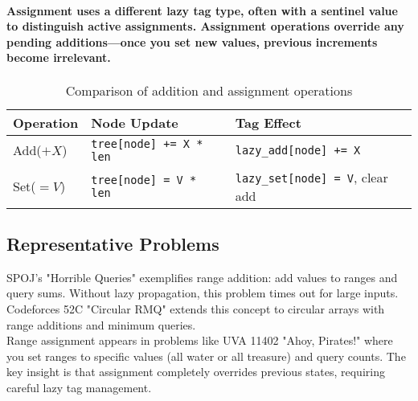 \paragraph{Assignment uses a different lazy tag type, often with a sentinel value to distinguish active assignments. Assignment operations override any pending additions—once you set new values, previous increments become irrelevant.}
\begin{table}
\footnotesize
\begin{tabular}{@{}lll@{}}
\toprule
\textbf{Operation} & \textbf{Node Update} & \textbf{Tag Effect} \\
\midrule
Add($+X$) & \texttt{tree[node] += X * len} & \texttt{lazy\_add[node] += X} \\
Set($=V$) & \texttt{tree[node] = V * len} & \texttt{lazy\_set[node] = V}, clear add \\
\bottomrule
\end{tabular}
\caption{Comparison of addition and assignment operations}
\end{table}
\subsection{Representative Problems}

SPOJ's "Horrible Queries" exemplifies range addition: add values to ranges and query sums. Without lazy propagation, this problem times out for large inputs.\\

Codeforces 52C "Circular RMQ" extends this concept to circular arrays with range additions and minimum queries.\\

Range assignment appears in problems like UVA 11402 "Ahoy, Pirates!" where you set ranges to specific values (all water or all treasure) and query counts. The key insight is that assignment completely overrides previous states, requiring careful lazy tag management.
